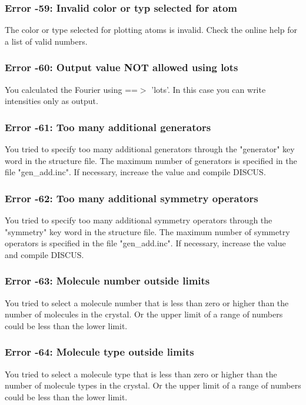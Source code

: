 \subsubsection{Error -59: Invalid color or typ selected for atom}
\par
The color or type selected for plotting atoms is invalid. Check the 
online help for a list of valid numbers. 
\subsubsection{Error -60: Output value NOT allowed using lots}
\par
You calculated the Fourier using ==$> $ 'lots'. In this case you can write 
intensities only as output. 
\subsubsection{Error -61: Too many additional generators}
\par
You tried to specify too many additional generators through the 
"generator" key word in the structure file. The maximum number of 
generators is specified in the file "gen\_add.inc". If necessary, increase 
the value and compile DISCUS. 
\subsubsection{Error -62: Too many additional symmetry operators}
\par
You tried to specify too many additional symmetry operators through the 
"symmetry"  key word in the structure file. The maximum number of 
symmetry operators is specified in the file "gen\_add.inc". If necessary, 
increase the value and compile DISCUS. 
\subsubsection{Error -63: Molecule number outside limits}
\par
You tried to select a molecule number that is less than zero or higher 
than the number of molecules in the crystal. Or the upper limit of a 
range of numbers could be less than the lower limit. 
\subsubsection{Error -64: Molecule type outside limits}
\par
You tried to select a molecule type that is less than zero or higher 
than the number of molecule types in the crystal. Or the upper limit of a 
range of numbers could be less than the lower limit. 
